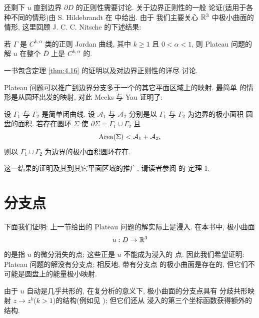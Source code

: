 还剩下 $u$ 直到边界 $\partial D$ 的正则性需要讨论. 关于边界正则性的一般
论证(适用于各种不同的情形)由 S. Hildebrandt 在 \cite{Hi} 中给出. 由于
我们主要关心 $\mathbb{R}^3$ 中极小曲面的情形, 这里回顾 J. C. C. Nitsche
\cite{Ni1} 的下述结果:

\begin{theorem}
\label{thm:4.16}
若 $\Gamma$ 是 $C^{k,\alpha}$ 类的正则 Jordan 曲线, 其中 $k\geq1$ 且
$0<\alpha<1$, 则 Plateau 问题的解 $u$ 在整个 $\overline{D}$ 上是
$C^{k,\alpha}$ 的.
\end{theorem}

\cite{Ni2} 一书包含定理 \ref{thm:4.16} 的证明以及对边界正则性的详尽
讨论.

Plateau 问题可以推广到边界分支多于一个的其它平面区域上的映射. 最简单
的情形是从圆环出发的映射, 对此 Meeks 与 Yau 证明了:

\begin{theorem}
\label{thm:4.17}
设 $\Gamma_1$ 与 $\Gamma_2$ 是简单闭曲线. 设 $\mathcal{A}_1$ 与
$\mathcal{A}_2$ 分别是以 $\Gamma_1$ 与 $\Gamma_2$ 为边界的极小面积
圆盘的面积. 若存在圆环 $\Sigma$ 使
$\partial\Sigma=\Gamma_1\cup\Gamma_2$ 且
\begin{equation*}
\operatorname{Area}(\Sigma)<\mathcal{A}_1+\mathcal{A}_2,
\end{equation*}
则以 $\Gamma_1\cup\Gamma_2$ 为边界的极小面积圆环存在.
\end{theorem}

这一结果的证明及其到其它平面区域的推广, 请读者参阅 \cite{MeY1} 的
定理 1.

\section{分支点}
\label{sec:4.4}

下面我们证明: 上一节给出的 Plateau 问题的解实际上是浸入. 在本书中,
极小曲面
\begin{equation*}
u:D\to\mathbb{R}^3
\end{equation*}
的是指 $u$ 的微分消失的点; 这些正是 $u$ 不能成为浸入的
点. 因此我们希望证明: Plateau 问题的解没有分支点; 相反地, 带有分支点
的极小曲面是存在的, 但它们不可能是圆盘上的能量极小映射.

由于 $u$ 自动是几乎共形的, 在复分析的意义下, 极小曲面的分支点具有
分歧共形映射 $z\to z^k$($k>1$)的结构(例如见 \cite{A}); 但它们还从
浸入的第三个坐标函数获得额外的结构.

